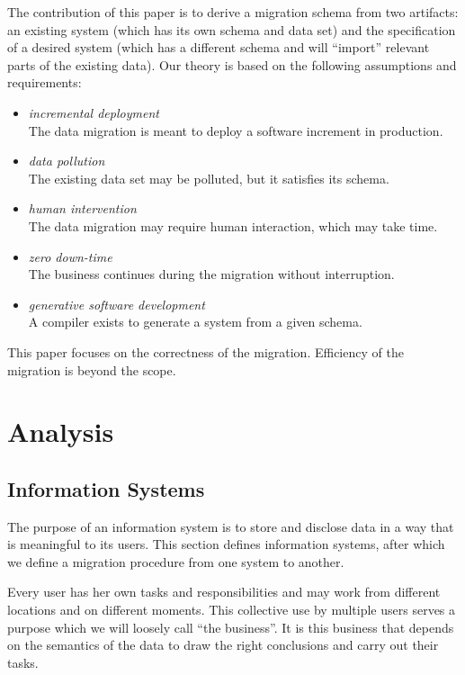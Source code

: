 \documentclass[runningheads]{llncs}
\begin{document}
   The contribution of this paper is to derive a migration schema from two artifacts: an existing system
   (which has its own schema and data set) and the specification of a desired system (which has a different schema and will ``import'' relevant parts of the existing data).   
   Our theory is based on the following assumptions and requirements:
\begin{itemize}
   \item {\em incremental deployment}\\The data migration is meant to deploy a software increment in production.
   \item {\em data pollution}\\The existing data set may be polluted, but it satisfies its schema.
   \item {\em human intervention}\\The data migration may require human interaction, which may take time.
   \item {\em zero down-time}\\The business continues during the migration without interruption.
   \item {\em generative software development}\\A compiler exists to generate a system from a given schema.
\end{itemize}
   This paper focuses on the correctness of the migration.
   Efficiency of the migration is beyond the scope.

\section{Analysis}
\label{sct:Analysis}
\subsection{Information Systems}
   The purpose of an information system is to store and disclose data in a way that is meaningful to its users.
   This section defines information systems, after which we define a migration procedure from one system to another.

   Every user has her own tasks and responsibilities and may work from different locations and on different moments.
   This collective use by multiple users serves a purpose which we will loosely call ``the business''.
   It is this business that depends on the semantics of the data to draw the right conclusions and carry out their tasks.
   
\end{document}
